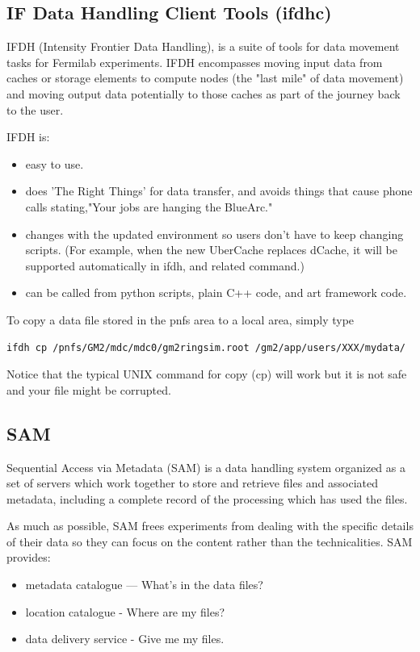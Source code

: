 \subsection{IF Data Handling Client Tools (ifdhc)}

IFDH (Intensity Frontier Data Handling), is a suite of tools for data movement tasks for Fermilab experiments. IFDH encompasses moving input data from caches or storage elements to compute nodes (the "last mile" of data movement) and moving output data potentially to those caches as part of the journey back to the user.

IFDH is:
\begin{itemize}
\item easy to use.
\item does 'The Right Things' for data transfer, and avoids things that cause phone calls stating,"Your jobs are hanging the BlueArc."
\item changes with the updated environment so users don't have to keep changing scripts. (For example, when the new UberCache replaces dCache, it will be supported automatically in ifdh, and related command.)
\item can be called from python scripts, plain C++ code, and art framework code.
\end{itemize}

To copy a data file stored in the pnfs area to a local area, simply type

\begin{verbatim}
ifdh cp /pnfs/GM2/mdc/mdc0/gm2ringsim.root /gm2/app/users/XXX/mydata/
\end{verbatim}

Notice that the typical UNIX command for copy (cp) will work but it is not safe and your file might be corrupted.

\subsection{SAM}
Sequential Access via Metadata (SAM) is a data handling system organized as a set of servers which work together to store and retrieve files and associated metadata, including a complete record of the processing which has used the files.

As much as possible, SAM frees experiments from dealing with the specific details of their data so they can focus on the content rather than the technicalities. SAM provides:
\begin{itemize}
\item metadata catalogue — What’s in the data files?
\item location catalogue - Where are my files?
\item data delivery service - Give me my files.
\end{itemize}

